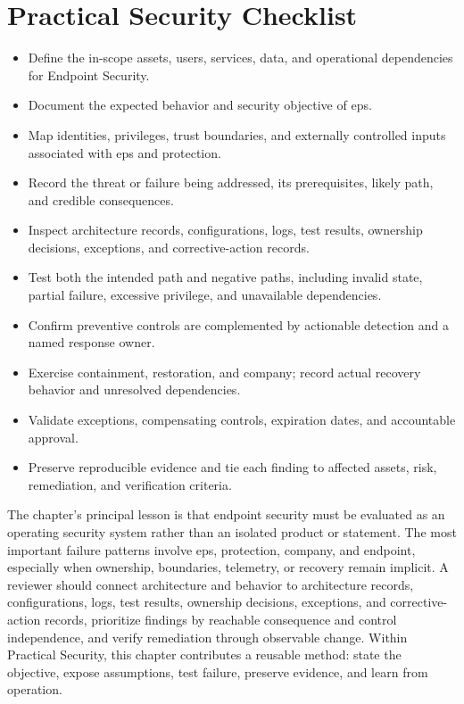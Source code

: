 \documentclass[11pt]{article}
\begin{document}
\section*{Practical Security Checklist}
\begin{itemize}[label=$\square$]
\item Define the in-scope assets, users, services, data, and operational dependencies for Endpoint Security.
\item Document the expected behavior and security objective of eps.
\item Map identities, privileges, trust boundaries, and externally controlled inputs associated with eps and protection.
\item Record the threat or failure being addressed, its prerequisites, likely path, and credible consequences.
\item Inspect architecture records, configurations, logs, test results, ownership decisions, exceptions, and corrective-action records.
\item Test both the intended path and negative paths, including invalid state, partial failure, excessive privilege, and unavailable dependencies.
\item Confirm preventive controls are complemented by actionable detection and a named response owner.
\item Exercise containment, restoration, and company; record actual recovery behavior and unresolved dependencies.
\item Validate exceptions, compensating controls, expiration dates, and accountable approval.
\item Preserve reproducible evidence and tie each finding to affected assets, risk, remediation, and verification criteria.
\end{itemize}
\begin{synthesisbox}
The chapter's principal lesson is that endpoint security must be evaluated as an operating security system rather than an isolated product or statement. The most important failure patterns involve eps, protection, company, and endpoint, especially when ownership, boundaries, telemetry, or recovery remain implicit. A reviewer should connect architecture and behavior to architecture records, configurations, logs, test results, ownership decisions, exceptions, and corrective-action records, prioritize findings by reachable consequence and control independence, and verify remediation through observable change. Within Practical Security, this chapter contributes a reusable method: state the objective, expose assumptions, test failure, preserve evidence, and learn from operation.
\end{synthesisbox}
\end{document}
